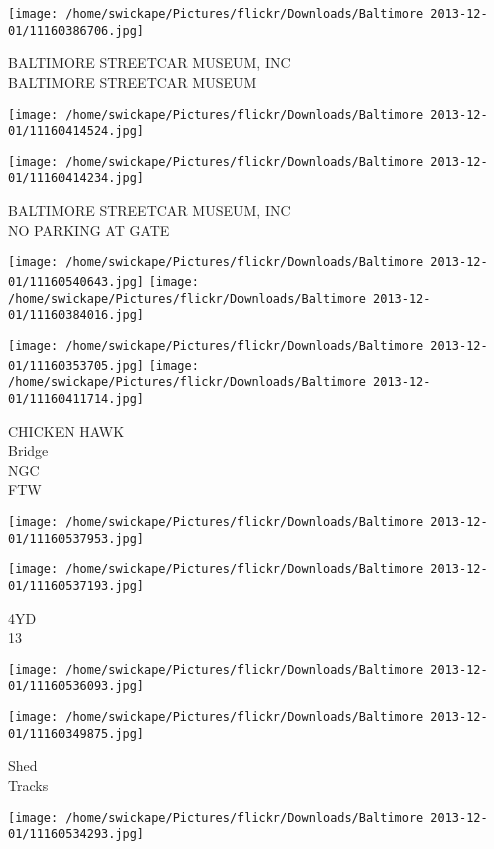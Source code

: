 \documentclass[10pt,letterpaper]{article}
\begin{document}
\vspace{0.25in}
\texttt{[image: /home/swickape/Pictures/flickr/Downloads/Baltimore 2013-12-01/11160386706.jpg]}

BALTIMORE STREETCAR MUSEUM, INC\\
BALTIMORE STREETCAR MUSEUM
\pagebreak

\texttt{[image: /home/swickape/Pictures/flickr/Downloads/Baltimore 2013-12-01/11160414524.jpg]}

\vspace{0.25in}
\texttt{[image: /home/swickape/Pictures/flickr/Downloads/Baltimore 2013-12-01/11160414234.jpg]}

BALTIMORE STREETCAR MUSEUM, INC\\
NO PARKING AT GATE
\pagebreak

\texttt{[image: /home/swickape/Pictures/flickr/Downloads/Baltimore 2013-12-01/11160540643.jpg]}
\texttt{[image: /home/swickape/Pictures/flickr/Downloads/Baltimore 2013-12-01/11160384016.jpg]}

\texttt{[image: /home/swickape/Pictures/flickr/Downloads/Baltimore 2013-12-01/11160353705.jpg]}
\texttt{[image: /home/swickape/Pictures/flickr/Downloads/Baltimore 2013-12-01/11160411714.jpg]}

CHICKEN HAWK\\
Bridge\\
NGC\\
FTW
\pagebreak

\texttt{[image: /home/swickape/Pictures/flickr/Downloads/Baltimore 2013-12-01/11160537953.jpg]}

\vspace{0.25in}
\texttt{[image: /home/swickape/Pictures/flickr/Downloads/Baltimore 2013-12-01/11160537193.jpg]}

4YD\\
13
\pagebreak

\texttt{[image: /home/swickape/Pictures/flickr/Downloads/Baltimore 2013-12-01/11160536093.jpg]}

\vspace{0.25in}
\texttt{[image: /home/swickape/Pictures/flickr/Downloads/Baltimore 2013-12-01/11160349875.jpg]}

Shed\\
Tracks
\pagebreak

\texttt{[image: /home/swickape/Pictures/flickr/Downloads/Baltimore 2013-12-01/11160534293.jpg]}
\end{document}
